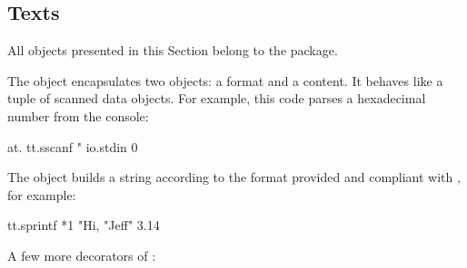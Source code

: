 
\subsection{Texts}\label{sec:strings}

All objects presented in this Section belong to the  package.

The  object encapsulates two  objects:
  a format and a content.
It behaves like a tuple of scanned data objects.
For example, this code parses a hexadecimal number from the console:

\begin{ffcode}
at.
  tt.sscanf
    "%
    io.stdin
  0
\end{ffcode}

The  object builds a string according to the format
  provided and compliant with \citet[Chapter 5]{posix}, for example:

\begin{ffcode}
tt.sprintf *1
  "Hi, %
  "Jeff"
  3.14
\end{ffcode}

A few more decorators of :

